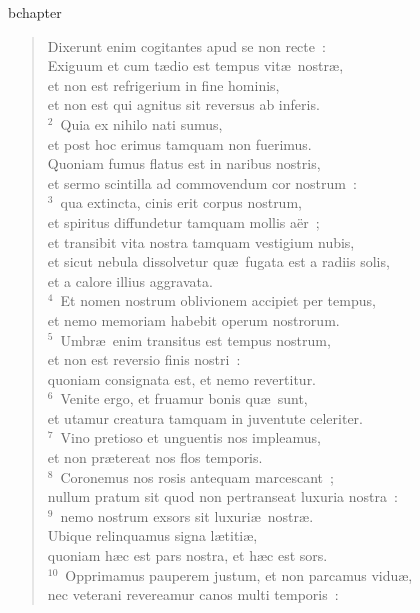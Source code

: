 bchapter\begin{flushleft}\begin{verse}\vspace{-19pt}Dixerunt enim cogitantes apud se non recte~:\\ Exiguum et cum t\ae dio est tempus vit\ae\ nostr\ae ,\\ et non est refrigerium in fine hominis,\\ et non est qui agnitus sit reversus ab inferis.\\
${}^{2}$~Quia ex nihilo nati sumus,\\ et post hoc erimus tamquam non fuerimus.\\ Quoniam fumus flatus est in naribus nostris,\\ et sermo scintilla ad commovendum cor nostrum~:\\
${}^{3}$~qua extincta, cinis erit corpus nostrum,\\ et spiritus diffundetur tamquam mollis a\"er~;\\ et transibit vita nostra tamquam vestigium nubis,\\ et sicut nebula dissolvetur qu\ae\ fugata est a radiis solis,\\ et a calore illius aggravata.\\
${}^{4}$~Et nomen nostrum oblivionem accipiet per tempus,\\ et nemo memoriam habebit operum nostrorum.\\
${}^{5}$~Umbr\ae\ enim transitus est tempus nostrum,\\ et non est reversio finis nostri~:\\ quoniam consignata est, et nemo revertitur.\\
${}^{6}$~Venite ergo, et fruamur bonis qu\ae\ sunt,\\ et utamur creatura tamquam in juventute celeriter.\\
${}^{7}$~Vino pretioso et unguentis nos impleamus,\\ et non pr\ae tereat nos flos temporis.\\
${}^{8}$~Coronemus nos rosis antequam marcescant~;\\ nullum pratum sit quod non pertranseat luxuria nostra~:\\
${}^{9}$~nemo nostrum exsors sit luxuri\ae\ nostr\ae .\\ Ubique relinquamus signa l\ae titi\ae ,\\ quoniam h\ae c est pars nostra, et h\ae c est sors.\\
${}^{10}$~Opprimamus pauperem justum, et non parcamus vidu\ae ,\\ nec veterani revereamur canos multi temporis~:\\

\end{verse}
\end{flushleft}
